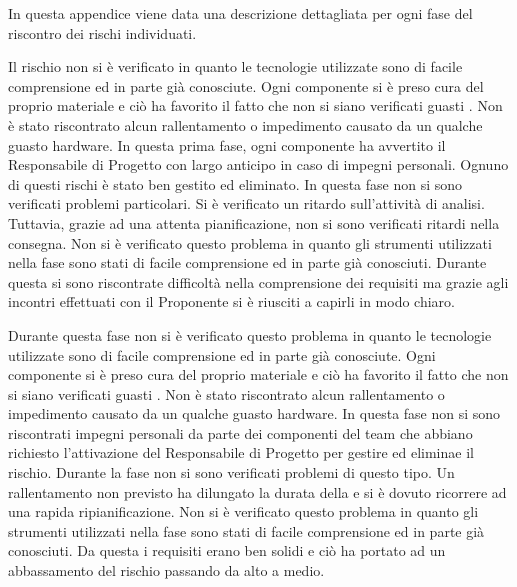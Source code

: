 	In questa appendice viene data una descrizione dettagliata per ogni fase del riscontro dei rischi individuati.


		Il rischio non si è verificato in quanto le tecnologie utilizzate sono di facile comprensione ed in parte già conosciute.
		Ogni componente si è preso cura del proprio materiale e ciò ha favorito il fatto che non si siano verificati guasti . Non è stato riscontrato alcun rallentamento o impedimento causato da un qualche guasto hardware.
		In questa prima fase, ogni componente ha avvertito il Responsabile di Progetto con largo anticipo in caso di impegni personali. Ognuno di questi rischi è stato ben gestito ed eliminato.
		In questa fase non si sono verificati problemi particolari.
		Si è verificato un ritardo sull’attività di analisi. Tuttavia, grazie ad una attenta pianificazione, non si sono verificati ritardi nella consegna.
		Non si è verificato questo problema in quanto gli strumenti utilizzati nella fase sono stati di facile comprensione ed in parte già conosciuti.
		Durante questa  si sono riscontrate difficoltà nella comprensione dei requisiti ma grazie agli incontri effettuati con il Proponente si è riusciti a capirli in modo chiaro.
		
	
		Durante questa fase non si è verificato questo problema in quanto le tecnologie utilizzate sono di facile comprensione ed in parte già conosciute. 
		Ogni componente si è preso cura del proprio materiale e ciò ha favorito il fatto che non si siano verificati guasti . Non è stato riscontrato alcun rallentamento o impedimento causato da un qualche guasto hardware.
		In questa fase non si sono riscontrati impegni personali da parte dei componenti del team che abbiano richiesto l'attivazione del Responsabile di Progetto per gestire ed eliminae il rischio.
		Durante la fase non si sono verificati problemi di questo tipo.
		Un rallentamento non previsto ha dilungato la durata della  e si è dovuto ricorrere ad una rapida ripianificazione.
		Non si è verificato questo problema in quanto gli strumenti utilizzati nella fase sono stati di facile comprensione ed in parte già conosciuti.
		Da questa  i requisiti erano ben solidi e ciò ha portato ad un abbassamento del rischio passando da alto a medio. 




